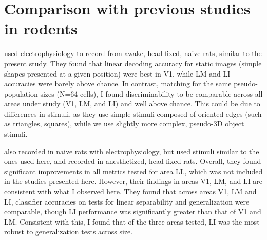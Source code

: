 \section{Comparison with previous studies in rodents}
\citet{Vermaercke2014} used electrophysiology to record from awake, head-fixed, naive rats, similar to the present study. They found that linear decoding accuracy for static images (simple shapes presented at a given position) were best in V1, while LM and LI accuracies were barely above chance. In contrast, matching for the same pseudo-population sizes (N=64 cells), I found discriminability to be comparable across all areas under study (V1, LM, and LI) and well above chance. This could be due to differences in stimuli, as they use simple stimuli composed of oriented edges (such as triangles, squares), while we use slightly more complex, pseudo-3D object stimuli.

\citet{Tafazoli2017} also recorded in naive rats with electrophysiology, but used stimuli similar to the ones used here, and recorded in anesthetized, head-fixed rats. Overall, they found significant improvements in all metrics tested for area LL, which was not included in the studies presented here. However, their findings in areas V1, LM, and LI are consistent with what I observed here. They found that across areas V1, LM and LI, classifier accuracies on tests for linear separability and generalization were comparable, though LI performance was significantly greater than that of V1 and LM. Consistent with this, I found that of the three areas tested, LI was the most robust to generalization tests across size.


